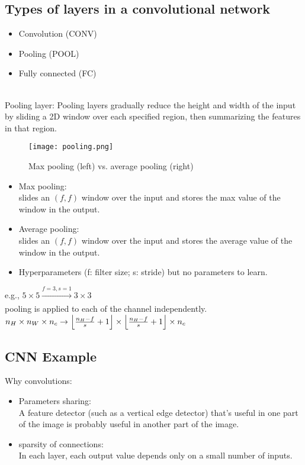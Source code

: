 \subsection{Types of layers in a convolutional network}
\begin{itemize}
\item
Convolution (CONV)
\item
Pooling (POOL)
\item
Fully connected (FC)
\end{itemize}
~\\
Pooling layer:
Pooling layers gradually reduce the height and width of the input by sliding a 2D window over each specified region, then summarizing the features in that region.
\begin{figure}[h]
    \centering
    \texttt{[image: pooling.png]}
    \caption{Max pooling (left) vs. average pooling (right)}
    \label{fig:pooling}
\end{figure}
\begin{itemize}
\item
Max pooling:\\
slides an $(f, f)$ window over the input and stores the max value of the window in the output.
\item
Average pooling:\\
slides an $(f, f)$ window over the input and stores the average value of the window in the output.
\item
Hyperparameters (f: filter size; s: stride) but no parameters to learn.
\end{itemize}
e.g., $5 \times 5 \xrightarrow[]{f = 3, s =1} 3 \times 3$\\
pooling is applied to each of the channel independently.\\
$n_H \times n_W \times n_c \rightarrow \Bigl \lfloor \frac{n_H - f}{s}+1 \Bigr \rfloor \times \Bigl \lfloor \frac{n_H - f}{s}+1 \Bigr \rfloor \times n_c $


%
\subsection{CNN Example}

Why convolutions: 
\begin{itemize}
\item
Parameters sharing:\\
A feature detector (such as a vertical edge detector) that's useful in one part of the image is probably useful in another part of the image.
\item
sparsity of connections:\\
In each layer, each output value depends only on a small number of inputs.
\end{itemize}

